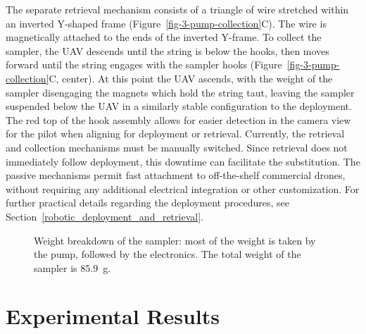 The separate retrieval mechanism consists of a triangle of wire stretched within an inverted Y-shaped frame (Figure~\ref{fig-3-pump-collection}C). The wire is magnetically attached to the ends of the inverted Y-frame. To collect the sampler, the UAV descends until the string is below the hooks, then moves forward until the string engages with the sampler hooks (Figure~\ref{fig-3-pump-collection}C, center). At this point the UAV ascends, with the weight of the sampler disengaging the magnets which hold the string taut, leaving the sampler suspended below the UAV in a similarly stable configuration to the deployment. The red top of the hook assembly allows for easier detection in the camera view for the pilot when aligning for deployment or retrieval. Currently, the retrieval and collection mechanisms must be manually switched. Since retrieval does not immediately follow deployment, this downtime can facilitate the substitution. The passive mechanisms permit fast attachment to off-the-shelf commercial drones, without requiring any additional electrical integration or other customization. For further practical details regarding the deployment procedures, see Section~\ref{robotic_deployment_and_retrieval}.

\begin{figure}[h!t]
\centering

\caption{Weight breakdown of the sampler: most of the weight is taken by the pump, followed by the electronics. The total weight of the sampler is 85.9~g.}
\label{sampler-weight-breakdown}
\end{figure}

\section{Experimental Results}

